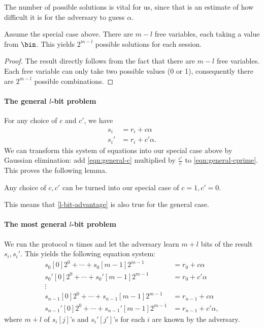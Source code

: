 The number of possible solutions is vital for us, since that is an estimate of 
how difficult it is for the adversary to guess \(\alpha\).

\begin{lemma}\label{l-bit-advantage}
  Assume the special case above.
  There are \(m-l\) free variables, each taking a value from \(\bin\).
  This yields \(2^{m-l}\) possible solutions for each session.
\end{lemma}
\begin{proof}
  The result directly follows from the fact that there are \(m-l\) free 
  variables.
  Each free variable can only take two possible values (0 or 1), consequently 
  there are \(2^{m-l}\) possible combinations.
\end{proof}

\paragraph*{The general \(l\)-bit problem}

For any choice of \(c\) and \(c'\), we have
\begin{align}
  \label{eqn:general-c}
  s_i &= r_i + c\alpha \\
  \label{eqn:general-cprime}
  s_i' &= r_i + c'\alpha.
\end{align}
We can transform this system of equations into our special case above by 
Gaussian elimination: add \cref{eqn:general-c} multiplied by \(\frac{c'}{c}\) 
to \cref{eqn:general-cprime}.
This proves the following lemma.

\begin{lemma}
  Any choice of \(c, c'\) can be turned into our special case of \(c = 1, c' = 
  0\).
\end{lemma}

This means that \cref{l-bit-advantage} is also true for the general case.

\paragraph*{The most general \(l\)-bit problem}

We run the protocol \(n\) times and let the adversary learn \(m+l\) bits of the 
result~\(s_i, s_i'\).
This yields the following equation system:
\begin{align*}
  s_0[0]2^0 + \dotsb + s_0[m-1]2^{m-1} &= r_0 + c\alpha \\
  s_0'[0]2^0 + \dotsb + s_0'[m-1]2^{m-1} &= r_0 + c'\alpha \\
  \vdots \\
  s_{n-1}[0]2^0 + \dotsb + s_{n-1}[m-1]2^{m-1} &= r_{n-1} + c\alpha \\
  s_{n-1}'[0]2^0 + \dotsb + s_{n-1}'[m-1]2^{m-1} &= r_{n-1} + c'\alpha,
\end{align*}
where \(m+l\) of \(s_i[j]\)'s and \(s_i'[j']\)'s for each \(i\) are known by 
the adversary.

